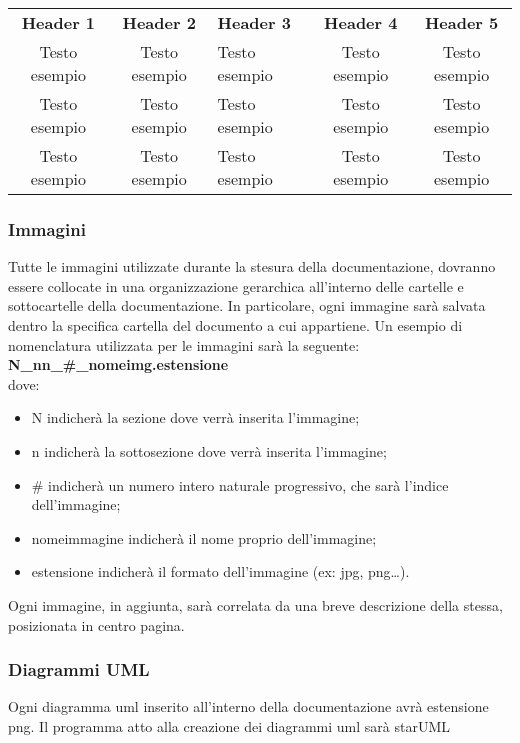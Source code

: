     \renewcommand{\arraystretch}{1.5}
    \centering
    \begin{longtable}{ c c  C{4cm}  c  c }
        \rowcolor{\primaryColor}
        \textcolor{\secondaryColor}{
        \textbf{Header 1}}     & \textcolor{\secondaryColor}{\textbf{Header 2}}       & \textcolor{\secondaryColor}
        {\textbf{Header 3}} & \textcolor{\secondaryColor}{\textbf{Header 4}} & \textcolor{\secondaryColor}{\textbf{Header 5}}                          \\
        Testo esempio                 & Testo esempio                                    & Testo esempio                                & Testo esempio & Testo esempio{} \\
        Testo esempio                & Testo esempio                                    & Testo esempio                                   & Testo esempio & Testo esempio{} \\
        Testo esempio                & Testo esempio                                    & Testo esempio                          & Testo esempio & Testo esempio{}    \\
    \end{longtable}


\subsubsection{Immagini}
Tutte le immagini utilizzate durante la stesura della documentazione, dovranno essere collocate in una organizzazione gerarchica all’interno delle cartelle e sottocartelle della documentazione. In particolare, ogni immagine sarà salvata dentro la specifica cartella del documento a cui appartiene. Un esempio di nomenclatura utilizzata per le immagini sarà la seguente:
\textbf{N\_nn\_\#\_nomeimg.estensione}\\
dove:
\begin{itemize}
	\item N indicherà la sezione dove verrà inserita l’immagine;
	\item n indicherà la sottosezione dove verrà inserita l’immagine;
	\item \# indicherà un numero intero naturale progressivo, che sarà l’indice dell’immagine;
	\item nomeimmagine indicherà il nome proprio dell’immagine;
	\item estensione indicherà il formato dell’immagine (ex: jpg, png…).
\end{itemize}
Ogni immagine, in aggiunta, sarà correlata da una breve descrizione della stessa, posizionata in centro pagina.

\subsubsection{Diagrammi UML}
Ogni diagramma uml inserito all’interno della documentazione avrà estensione png. Il programma atto alla creazione dei diagrammi uml sarà starUML





